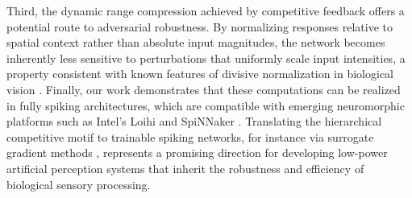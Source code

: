 Third, the dynamic range compression achieved by competitive feedback offers a potential route to adversarial robustness. By normalizing responses relative to spatial context rather than absolute input magnitudes, the network becomes inherently less sensitive to perturbations that uniformly scale input intensities, a property consistent with known features of divisive normalization in biological vision \citep{Carandini2011}. Finally, our work demonstrates that these computations can be realized in fully spiking architectures, which are compatible with emerging neuromorphic platforms such as Intel's Loihi \citep{Davies2018} and SpiNNaker \citep{Furber2014}. Translating the hierarchical competitive motif to trainable spiking networks, for instance via surrogate gradient methods \citep{Neftci2019}, represents a promising direction for developing low-power artificial perception systems that inherit the robustness and efficiency of biological sensory processing.

